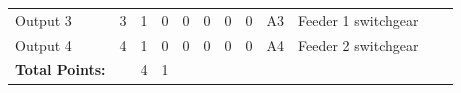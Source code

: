 \begin{table}[!htp]
{\begin{tabular}{lcccccccccll}
			Output 3                     & 3                       & 1                                           & 0                                          & 0           & 0           & 0            & 0                & A3    & Feeder 1 switchgear          &                                                   \\
			Output 4                     & 4                       & 1                                           & 0                                          & 0           & 0           & 0            & 0                & A4    & Feeder 2 switchgear          &                                                   \\ \midrule
			\textbf{Total Points:}       &                         & 4                                           & 1                                          &             &             &              &                  &       &                              &                                  &                \\ \bottomrule
		\end{tabular}
	}
\end{table}
